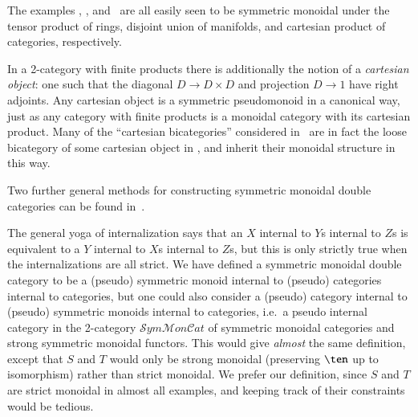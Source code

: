 \begin{eg}
  The examples \lMod, \lnCob, and \lProf\ are all easily seen to be
  symmetric monoidal under the tensor product of rings, disjoint union
  of manifolds, and cartesian product of categories, respectively.
\end{eg}

\begin{rmk}
  In a 2-category with finite products there is additionally the
  notion of a \emph{cartesian object}: one such that the diagonal
  $D\to D\times D$ and projection $D\to 1$ have right adjoints.  Any
  cartesian object is a symmetric pseudomonoid in a canonical way,
  just as any category with finite products is a monoidal category
  with its cartesian product.  Many of the ``cartesian bicategories''
  considered in~\cite{cw:cart-bicats-i,ckww:cartbicats-ii} are in
  fact the loose bicategory of some cartesian object in \cDbl,
  and inherit their monoidal structure in this way.
\end{rmk}

Two further general methods for constructing symmetric monoidal double
categories can be found in~\cite{shulman:frbi}.

\begin{rmk}
  The general yoga of internalization says that an $X$ internal to
  $Y$s internal to $Z$s is equivalent to a $Y$ internal to $X$s
  internal to $Z$s, but this is only strictly true when the
  internalizations are all strict.  We have defined a symmetric
  monoidal double category to be a (pseudo) symmetric monoid internal
  to (pseudo) categories internal to categories, but one could also
  consider a (pseudo) category internal to (pseudo) symmetric monoids
  internal to categories, i.e.\ a pseudo internal category in the
  2-category
  $\mathcal{S}\mathit{ym}\mathcal{M}\mathit{on}\mathcal{C}\mathit{at}$
  of symmetric monoidal categories and strong symmetric monoidal
  functors.  This would give \emph{almost} the same definition, except
  that $S$ and $T$ would only be strong monoidal (preserving $\ten$ up
  to isomorphism) rather than strict monoidal.  We prefer our
  definition, since $S$ and $T$ are strict monoidal in almost all
  examples, and keeping track of their constraints would be tedious.
\end{rmk}

